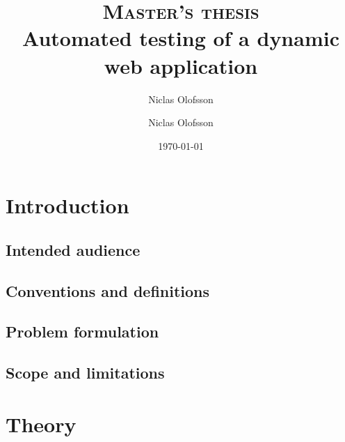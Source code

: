 \documentclass[a4paper]{report}
\author{Niclas Olofsson}
\title{\textsc{Master's thesis}\\
\Huge\textbf{Automated testing of a dynamic web application}}
\author{Niclas Olofsson}
\date{\today}
\begin{document}
\renewcommand{\lstlistingname}{Code listing}

\maketitle
\newpage

\begin{abstract}

\end{abstract}

\renewcommand{\abstractname}{Acknowledgments}

\begin{abstract}

\end{abstract}


\setcounter{tocdepth}{4}
\tableofcontents
\thispagestyle{empty}
\newpage

\setcounter{page}{1}

\chapter{Introduction}

  \label{sec:background}
  

  \section{Intended audience}
  

  \section{Conventions and definitions}
  

  \section{Problem formulation}
  

  \section{Scope and limitations}
  


\chapter{Theory}
\label{chap:theory}
\end{document}

